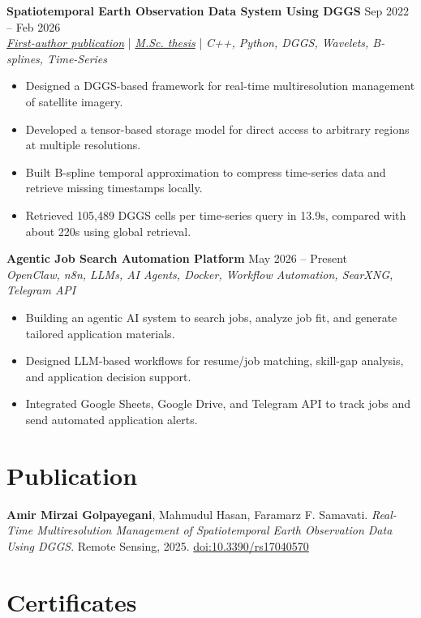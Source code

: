 \documentclass[a4paper,10pt]{article}
\begin{document}
\noindent
\textbf{Spatiotemporal Earth Observation Data System Using DGGS} \hfill Sep 2022 -- Feb 2026 \\
\textit{\href{https://doi.org/10.3390/rs17040570}{First-author publication}} | \textit{\href{https://ucalgary.scholaris.ca/items/114b394b-e516-4732-bd3a-45dd6160d480}{M.Sc. thesis}} | \textit{C++, Python, DGGS, Wavelets, B-splines, Time-Series}
\begin{itemize}[leftmargin=0.25in]
    \item Designed a DGGS-based framework for real-time multiresolution management of satellite imagery.
    \item Developed a tensor-based storage model for direct access to arbitrary regions at multiple resolutions.
    \item Built B-spline temporal approximation to compress time-series data and retrieve missing timestamps locally.
    \item Retrieved 105,489 DGGS cells per time-series query in 13.9s, compared with about 220s using global retrieval.
\end{itemize}

\noindent
\textbf{Agentic Job Search Automation Platform} \hfill May 2026 -- Present \\
\textit{OpenClaw, n8n, LLMs, AI Agents, Docker, Workflow Automation, SearXNG, Telegram API}
\begin{itemize}[leftmargin=0.25in]
    \item Building an agentic AI system to search jobs, analyze job fit, and generate tailored application materials.
    \item Designed LLM-based workflows for resume/job matching, skill-gap analysis, and application decision support.
    \item Integrated Google Sheets, Google Drive, and Telegram API to track jobs and send automated application alerts.
\end{itemize}

\section*{Publication}

\textbf{Amir Mirzai Golpayegani}, Mahmudul Hasan, Faramarz F. Samavati.
\textit{Real-Time Multiresolution Management of Spatiotemporal Earth Observation Data Using DGGS}.
Remote Sensing, 2025. \href{https://doi.org/10.3390/rs17040570}{doi:10.3390/rs17040570}

\section*{Certificates}
\end{document}

